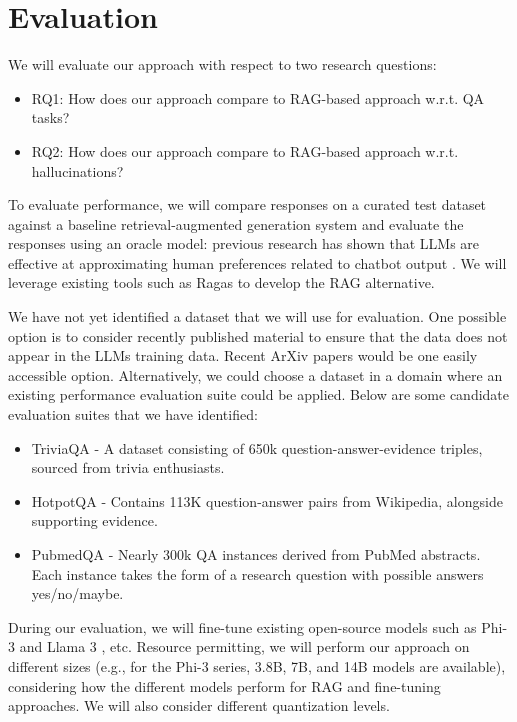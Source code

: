 \section{Evaluation}
We will evaluate our approach with respect to two research questions:

\begin{itemize}
\item RQ1: How does our approach compare to RAG-based approach w.r.t. QA tasks?
\item RQ2: How does our approach compare to RAG-based approach w.r.t. hallucinations?
\end{itemize}

To evaluate performance, we will compare responses on a curated test dataset
against a baseline retrieval-augmented generation system and evaluate the
responses using an oracle model: previous research has shown that LLMs are
effective at approximating human preferences related to chatbot output
\citep{zheng_judging_2023}. We will leverage existing tools such as Ragas
\citep{ragas} to develop the RAG alternative.

We have not yet identified a dataset that we will use for evaluation. One
possible option is to consider recently published material to ensure that the
data does not appear in the LLMs training data. Recent ArXiv papers would be one
easily accessible option. Alternatively, we could choose a dataset in a domain
where an existing performance evaluation suite could be applied. Below are some
candidate evaluation suites that we have identified:

\begin{itemize}
\item TriviaQA \citep{joshi_triviaqa_2017} - A dataset consisting of 650k question-answer-evidence triples, sourced from trivia enthusiasts.
\item HotpotQA \citep{yang_hotpotqa_2018} - Contains 113K question-answer pairs from Wikipedia, alongside supporting evidence.
\item PubmedQA \citep{jin_pubmedqa_2019} - Nearly 300k QA instances derived from PubMed abstracts. Each instance takes the form of a research question with possible answers yes/no/maybe.
\end{itemize}

During our evaluation, we will fine-tune existing open-source models such as
Phi-3 \citep{abdin_phi-3_2024} and Llama 3 \citep{dubey_llama_2024}, etc. Resource permitting,
we will perform our approach on different sizes (e.g., for the Phi-3 series, 3.8B,
7B, and 14B models are available), considering how the different models perform
for RAG and fine-tuning approaches. We will also consider different quantization
levels.
